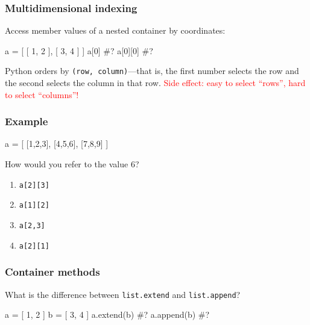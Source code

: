 \documentclass[11pt]{beamer}
\begin{document}
\begin{frame}[fragile]
  \frametitle{Multidimensional indexing}
  \Enlarge

  \begin{itemize}
  \myitem  Access member values of a nested container by coordinates: %
  \end{itemize}
  \begin{semiverbatim}
a = [ [ 1, 2 ], [ 3, 4 ] ]
a[0]    #? %
a[0][0] #? %
  \end{semiverbatim}
  \begin{itemize}
  \myitem  Python orders by \texttt{(row, column)}---that is, the first number selects the row and the second selects the column in that row. %
  \myitem  \textcolor{red}{Side effect:  easy to select ``rows'', hard to select ``columns''!}
  \end{itemize}
\end{frame}

\begin{frame}[fragile]
  \frametitle{Example}
  \Enlarge

  \begin{semiverbatim}
a = [ [1,2,3], [4,5,6], [7,8,9] ]
  \end{semiverbatim}
  How would you refer to the value 6?
  \begin{enumerate}[label=\Alph*]
  \item  \texttt{a[2][3]}
  \item  \texttt{a[1][2]} %
  \item  \texttt{a[2,3]}
  \item  \texttt{a[2][1]}
  \end{enumerate}
\end{frame}

\begin{frame}[fragile]
  \frametitle{Container methods}
  \Enlarge

  \begin{itemize}
  \myitem  What is the difference between \texttt{list.extend} and \texttt{list.append}?
  \end{itemize}
  \begin{semiverbatim}
a = [ 1, 2 ]
b = [ 3, 4 ]
a.extend(b)  #?
a.append(b)  #?
  \end{semiverbatim}
\end{frame}
\end{document}
